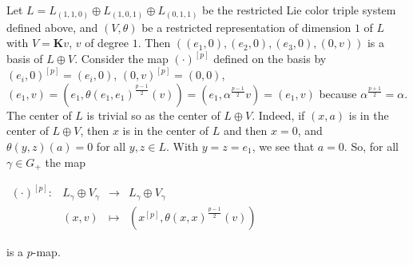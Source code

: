\documentclass[11pt, twoside]{article}
\begin{document}
\begin{ex}
    Let  $L=L_{(1,1,0)}\oplus L_{(1,0,1)} \oplus L_{(0,1,1)} $ be the restricted Lie color triple system defined above, and $(V,\theta) $ be a restricted representation of dimension $1$ of $L$ with $V=\mathbf{K}v $, $v$ of degree $1$. Then $((e_1,0),(e_2,0),(e_3,0),(0,v)) $ is a basis of $L\oplus V $. Consider the map $(\cdot)^{[p]} $ defined on the basis by $(e_i,0)^{[p]}= (e_i,0) $, $(0,v)^{[p]}= (0,0) $, $(e_1,v)=(e_1,\theta(e_1,e_1)^{\frac{p-1}{2}}(v))=(e_1,\alpha^{\frac{p-1}{2}}v)=(e_1,v) $ because $\alpha^{\frac{p+1}{2}}=\alpha $. The center of $L$ is trivial so as the center of $L\oplus V $. Indeed, if $(x,a) $ is in the center of $L\oplus V$, then $x$ is in the center of $L$ and then $x=0$, and $\theta(y,z)(a)=0 $ for all $y,z\in L $. With $y=z=e_1 $, we see that $a=0$. So, for all $\gamma\in G_+ $ the map \begin{center}
    $\begin{array}{lrcl}
(\cdot)^{[p]} : & L_\gamma\oplus V_\gamma & \longrightarrow & L_\gamma\oplus V_\gamma \\
    & (x,v) & \longmapsto & (x^{[p]},\theta(x,x)^{\frac{p-1}{2}}(v))\end{array}$ \end{center} is a $p$-map.
\end{ex}
\end{document}
